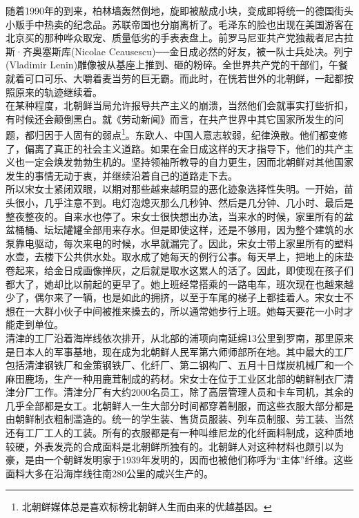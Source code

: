 \ifnum{}
	\begin{multicols}{\theparacolNo}
\fi
随着1990年的到来，柏林墙轰然倒地，旋即被敲成小块，变成即将统一的德国街头小贩手中热卖的纪念品。苏联帝国也分崩离析了。毛泽东的脸也出现在美国游客在北京买的那种哗众取宠、质量低劣的手表表盘上。前罗马尼亚共产党独裁者尼古拉斯·齐奥塞斯库(Nicolae Ceausescu)──金日成必然的好友，被一队士兵处决。列宁(Vladimir Lenin)雕像被从基座上推到、砸的粉碎。全世界共产党的干部们，午餐就着可口可乐、大嚼着麦当劳的巨无霸。而此时，在恍若世外的北朝鲜，一起都按照原来的轨迹继续着。\\

在某种程度，北朝鲜当局允许报导共产主义的崩溃，当然他们会就事实打些折扣，有时候还会颠倒黑白。就《劳动新闻》而言，在共产世界中其它国家所发生的问题，都归因于人固有的弱点\footnote{北朝鲜媒体总是喜欢标榜北朝鲜人生而由来的优越基因。}。东欧人、中国人意志软弱，纪律涣散。他们都变修了，偏离了真正的社会主义道路。如果在金日成这样的天才指导下，他们的共产主义也一定会焕发勃勃生机的。坚持领袖所教导的自力更生，因而北朝鲜对其他国家发生的事情无动于衷，并继续沿着自己的道路走下去。\\

所以宋女士紧闭双眼，以期对那些越来越明显的恶化迹象选择性失明。一开始，苗头很小，几乎注意不到。电灯泡熄灭那么几秒钟、然后是几分钟、几小时、最后是整夜整夜的。自来水也停了。宋女士很快想出办法，当来水的时候，家里所有的盆盆桶桶、坛坛罐罐全部用来存水。但是即使这样，还是不够用，因为整个建筑的水泵靠电驱动，每次来电的时候，水早就漏完了。因此，宋女士带上家里所有的塑料水壶，去楼下公共供水处。取水成了她每天的例行公事。每天早上，把地上的床垫卷起来，给金日成画像掸灰，之后就是取水这累人的活了。因此，即使现在孩子们都大了，她却比以前起的更早了。她上班经常搭乘的一路电车，班次现在也越来越少了，偶尔来了一辆，也是如此的拥挤，以至于车尾的梯子上都挂着人。宋女士不想在一大群小伙子中间被推来搡去的，所以通常她步行上班。她每天要花一小时才能走到单位。\\

清津的工厂沿着海岸线依次排开，从北部的浦项向南延绵13公里到罗南，那里原来是日本人的军事基地，现在成为北朝鲜人民军第六师师部所在地。其中最大的工厂包括清津钢铁厂和金策钢铁厂、化纤厂、第二钢构厂、五月十日煤炭机械厂和一个麻田鹿场，生产一种用鹿茸制成的药材。宋女士在位于工业区北部的朝鲜制衣厂清津分厂工作。清津分厂有大约2000名员工，除了高层管理人员和卡车司机，其余的几乎全部都是女工。北朝鲜人一生大部分时间都穿着制服，而这些衣服大部分都是由朝鲜制衣粗制滥造的。统一的学生装、售货员服装、列车员制服、劳工装、当然还有工厂工人的工装。所有的衣服都是有一种叫维尼龙的化纤面料制成，这种质地较硬，外表发亮的合成面料是北朝鲜所独有的。北朝鲜人对这种材料也颇引以为豪，是由一个朝鲜发明家于1939年发明的，因而也被他们称呼为“主体”纤维。这些面料大多在沿海岸线往南280公里的咸兴生产的。\\


\end{multicols}
